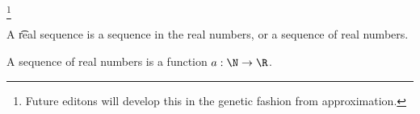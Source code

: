 
\footnote{Future editons will develop this in the genetic fashion from approximation.}


A \t{real sequence} is a sequence in the real numbers, or a sequence of real numbers.


A sequence of real numbers is a function $a: \N \to \R$.

\blankpage
